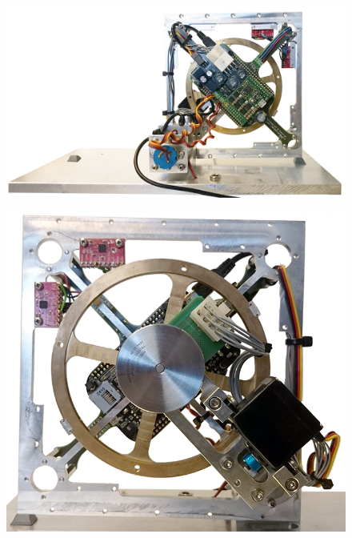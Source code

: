  \begin{minipage}{\linewidth}
  	\begin{minipage}{0.45\linewidth}
  		\begin{figure}[H]
  			\includegraphics[scale=0.21]{figures/Cubli-5}
  			\centering
  			\vspace{-.4cm}
  			\captionsetup{justification=centering}
  			\label{Cubli-5}
  		\end{figure}\vspace{-5mm}
  	\end{minipage}
  	\hspace{0.11\linewidth}
  	\begin{minipage}{0.45\linewidth}
  		\begin{figure}[H]
  			\includegraphics[scale=.18]{figures/Cubli-6}
  			\centering
  			\vspace{.8cm}
  			\captionsetup{justification=centering}
  			\label{Cubli-6}
  		\end{figure}\vspace{-6mm}
  	\end{minipage}
  \end{minipage}

